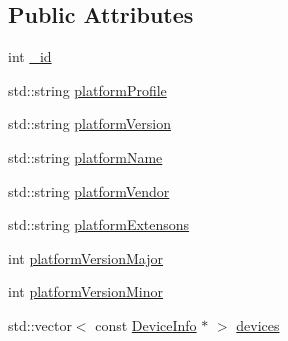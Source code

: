 \subsection*{Public Attributes}
\begin{DoxyCompactItemize}
\item 
int \hyperlink{structcv_1_1ocl_1_1PlatformInfo_a1b4f06d8d3562071821d2da60ad27362}{\-\_\-id}
\item 
std\-::string \hyperlink{structcv_1_1ocl_1_1PlatformInfo_a3a5589ff59ec7f2983fa388d422660e6}{platform\-Profile}
\item 
std\-::string \hyperlink{structcv_1_1ocl_1_1PlatformInfo_a43e5944add5f1ad3fa4526d4ccc6aa81}{platform\-Version}
\item 
std\-::string \hyperlink{structcv_1_1ocl_1_1PlatformInfo_a22de70e1ad52a139dd76c63cf379910c}{platform\-Name}
\item 
std\-::string \hyperlink{structcv_1_1ocl_1_1PlatformInfo_a2254b32339945a6cde6bdddfe7dfe07d}{platform\-Vendor}
\item 
std\-::string \hyperlink{structcv_1_1ocl_1_1PlatformInfo_a5ab150ac5127abf11ab9e74b2f556404}{platform\-Extensons}
\item 
int \hyperlink{structcv_1_1ocl_1_1PlatformInfo_a638a33ff45f65ef66a66b137d2bf4185}{platform\-Version\-Major}
\item 
int \hyperlink{structcv_1_1ocl_1_1PlatformInfo_afe862ee34afab0ef766994a3f7af500f}{platform\-Version\-Minor}
\item 
std\-::vector$<$ const \hyperlink{structcv_1_1ocl_1_1DeviceInfo}{Device\-Info} $\ast$ $>$ \hyperlink{structcv_1_1ocl_1_1PlatformInfo_aca552d96ff3ed8f1ee1d090b0ba881b1}{devices}
\end{DoxyCompactItemize}


